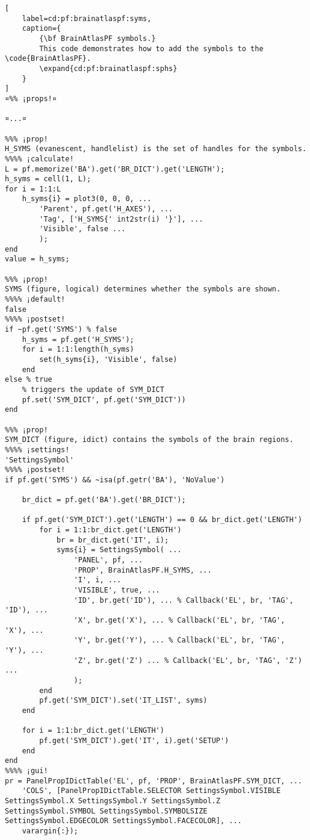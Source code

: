 \documentclass{tufte-handout}
\begin{document}
\begin{lstlisting}[
	label=cd:pf:brainatlaspf:syms,
	caption={
		{\bf BrainAtlasPF symbols.}
		This code demonstrates how to add the symbols to the \code{BrainAtlasPF}.
		\expand{cd:pf:brainatlaspf:sphs}
	}
]
¤%% ¡props!¤

¤...¤

%%% ¡prop!
H_SYMS (evanescent, handlelist) is the set of handles for the symbols.
%%%% ¡calculate!
L = pf.memorize('BA').get('BR_DICT').get('LENGTH');
h_syms = cell(1, L);
for i = 1:1:L
    h_syms{i} = plot3(0, 0, 0, ...
        'Parent', pf.get('H_AXES'), ...
        'Tag', ['H_SYMS{' int2str(i) '}'], ...
        'Visible', false ...
        );
end
value = h_syms;

%%% ¡prop!
SYMS (figure, logical) determines whether the symbols are shown.
%%%% ¡default!
false
%%%% ¡postset!
if ~pf.get('SYMS') % false
    h_syms = pf.get('H_SYMS');
    for i = 1:1:length(h_syms)
        set(h_syms{i}, 'Visible', false)
    end        
else % true
    % triggers the update of SYM_DICT
    pf.set('SYM_DICT', pf.get('SYM_DICT'))
end

%%% ¡prop!
SYM_DICT (figure, idict) contains the symbols of the brain regions.
%%%% ¡settings!
'SettingsSymbol'
%%%% ¡postset!
if pf.get('SYMS') && ~isa(pf.getr('BA'), 'NoValue')
    
    br_dict = pf.get('BA').get('BR_DICT');

	if pf.get('SYM_DICT').get('LENGTH') == 0 && br_dict.get('LENGTH')
        for i = 1:1:br_dict.get('LENGTH')
            br = br_dict.get('IT', i);
            syms{i} = SettingsSymbol( ...
                'PANEL', pf, ...
                'PROP', BrainAtlasPF.H_SYMS, ...
                'I', i, ...
                'VISIBLE', true, ...
                'ID', br.get('ID'), ... % Callback('EL', br, 'TAG', 'ID'), ...
                'X', br.get('X'), ... % Callback('EL', br, 'TAG', 'X'), ...
                'Y', br.get('Y'), ... % Callback('EL', br, 'TAG', 'Y'), ...
                'Z', br.get('Z') ... % Callback('EL', br, 'TAG', 'Z') ...
                );
        end
        pf.get('SYM_DICT').set('IT_LIST', syms)
    end
    
    for i = 1:1:br_dict.get('LENGTH')
        pf.get('SYM_DICT').get('IT', i).get('SETUP')
    end
end
%%%% ¡gui!
pr = PanelPropIDictTable('EL', pf, 'PROP', BrainAtlasPF.SYM_DICT, ...
    'COLS', [PanelPropIDictTable.SELECTOR SettingsSymbol.VISIBLE SettingsSymbol.X SettingsSymbol.Y SettingsSymbol.Z SettingsSymbol.SYMBOL SettingsSymbol.SYMBOLSIZE SettingsSymbol.EDGECOLOR SettingsSymbol.FACECOLOR], ...
    varargin{:});


\end{lstlisting}
\end{document}
